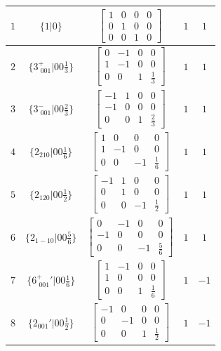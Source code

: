 \documentclass[fleqn,8pt]{jsarticle}
\begin{document}
\begin{longtable}{ccccc}
$ 1 $ & $ \{1|0\} $ & $ \begin{bmatrix} 1 & 0 & 0 & 0 \\ 0 & 1 & 0 & 0 \\ 0 & 0 & 1 & 0 \end{bmatrix} $ & $ 1 $ & $ 1 $ \\ \hline
$ 2 $ & $ \{3^{+}_{\,\,001}|0 0 \frac{1}{3}\} $ & $ \begin{bmatrix} 0 & -1 & 0 & 0 \\ 1 & -1 & 0 & 0 \\ 0 & 0 & 1 & \frac{1}{3} \end{bmatrix} $ & $ 1 $ & $ 1 $ \\ \hline
$ 3 $ & $ \{3^{-}_{\,\,001}|0 0 \frac{2}{3}\} $ & $ \begin{bmatrix} -1 & 1 & 0 & 0 \\ -1 & 0 & 0 & 0 \\ 0 & 0 & 1 & \frac{2}{3} \end{bmatrix} $ & $ 1 $ & $ 1 $ \\ \hline
$ 4 $ & $ \{2{}_{210}|0 0 \frac{1}{6}\} $ & $ \begin{bmatrix} 1 & 0 & 0 & 0 \\ 1 & -1 & 0 & 0 \\ 0 & 0 & -1 & \frac{1}{6} \end{bmatrix} $ & $ 1 $ & $ 1 $ \\ \hline
$ 5 $ & $ \{2{}_{120}|0 0 \frac{1}{2}\} $ & $ \begin{bmatrix} -1 & 1 & 0 & 0 \\ 0 & 1 & 0 & 0 \\ 0 & 0 & -1 & \frac{1}{2} \end{bmatrix} $ & $ 1 $ & $ 1 $ \\ \hline
$ 6 $ & $ \{2{}_{1-10}|0 0 \frac{5}{6}\} $ & $ \begin{bmatrix} 0 & -1 & 0 & 0 \\ -1 & 0 & 0 & 0 \\ 0 & 0 & -1 & \frac{5}{6} \end{bmatrix} $ & $ 1 $ & $ 1 $ \\ \hline
$ 7 $ & $ \{6^{+}_{\,\,001}{}'|0 0 \frac{1}{6}\} $ & $ \begin{bmatrix} 1 & -1 & 0 & 0 \\ 1 & 0 & 0 & 0 \\ 0 & 0 & 1 & \frac{1}{6} \end{bmatrix} $ & $ 1 $ & $ -1 $ \\ \hline
$ 8 $ & $ \{2{}_{001}{}'|0 0 \frac{1}{2}\} $ & $ \begin{bmatrix} -1 & 0 & 0 & 0 \\ 0 & -1 & 0 & 0 \\ 0 & 0 & 1 & \frac{1}{2} \end{bmatrix} $ & $ 1 $ & $ -1 $ \\ \hline

\end{longtable}
\end{document}

